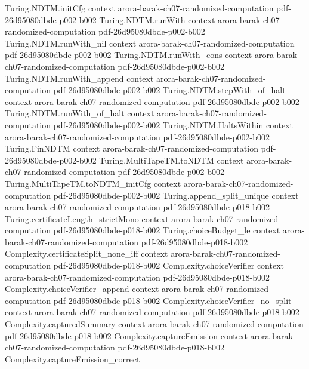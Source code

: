 \begin{theorem}
\proofstep
  {Turing.NDTM.initCfg}
  {context}
  {arora-barak-ch07-randomized-computation}
  {pdf-26d95080dbde-p002-b002}
\proofstep
  {Turing.NDTM.runWith}
  {context}
  {arora-barak-ch07-randomized-computation}
  {pdf-26d95080dbde-p002-b002}
\proofstep
  {Turing.NDTM.runWith_nil}
  {context}
  {arora-barak-ch07-randomized-computation}
  {pdf-26d95080dbde-p002-b002}
\proofstep
  {Turing.NDTM.runWith_cons}
  {context}
  {arora-barak-ch07-randomized-computation}
  {pdf-26d95080dbde-p002-b002}
\proofstep
  {Turing.NDTM.runWith_append}
  {context}
  {arora-barak-ch07-randomized-computation}
  {pdf-26d95080dbde-p002-b002}
\proofstep
  {Turing.NDTM.stepWith_of_halt}
  {context}
  {arora-barak-ch07-randomized-computation}
  {pdf-26d95080dbde-p002-b002}
\proofstep
  {Turing.NDTM.runWith_of_halt}
  {context}
  {arora-barak-ch07-randomized-computation}
  {pdf-26d95080dbde-p002-b002}
\proofstep
  {Turing.NDTM.HaltsWithin}
  {context}
  {arora-barak-ch07-randomized-computation}
  {pdf-26d95080dbde-p002-b002}
\proofstep
  {Turing.FinNDTM}
  {context}
  {arora-barak-ch07-randomized-computation}
  {pdf-26d95080dbde-p002-b002}
\proofstep
  {Turing.MultiTapeTM.toNDTM}
  {context}
  {arora-barak-ch07-randomized-computation}
  {pdf-26d95080dbde-p002-b002}
\proofstep
  {Turing.MultiTapeTM.toNDTM_initCfg}
  {context}
  {arora-barak-ch07-randomized-computation}
  {pdf-26d95080dbde-p002-b002}
\proofstep
  {Turing.append_split_unique}
  {context}
  {arora-barak-ch07-randomized-computation}
  {pdf-26d95080dbde-p018-b002}
\proofstep
  {Turing.certificateLength_strictMono}
  {context}
  {arora-barak-ch07-randomized-computation}
  {pdf-26d95080dbde-p018-b002}
\proofstep
  {Turing.choiceBudget_le}
  {context}
  {arora-barak-ch07-randomized-computation}
  {pdf-26d95080dbde-p018-b002}
\proofstep
  {Complexity.certificateSplit_none_iff}
  {context}
  {arora-barak-ch07-randomized-computation}
  {pdf-26d95080dbde-p018-b002}
\proofstep
  {Complexity.choiceVerifier}
  {context}
  {arora-barak-ch07-randomized-computation}
  {pdf-26d95080dbde-p018-b002}
\proofstep
  {Complexity.choiceVerifier_append}
  {context}
  {arora-barak-ch07-randomized-computation}
  {pdf-26d95080dbde-p018-b002}
\proofstep
  {Complexity.choiceVerifier_no_split}
  {context}
  {arora-barak-ch07-randomized-computation}
  {pdf-26d95080dbde-p018-b002}
\proofstep
  {Complexity.capturedSummary}
  {context}
  {arora-barak-ch07-randomized-computation}
  {pdf-26d95080dbde-p018-b002}
\proofstep
  {Complexity.captureEmission}
  {context}
  {arora-barak-ch07-randomized-computation}
  {pdf-26d95080dbde-p018-b002}
\proofstep
  {Complexity.captureEmission_correct}

\end{theorem}
